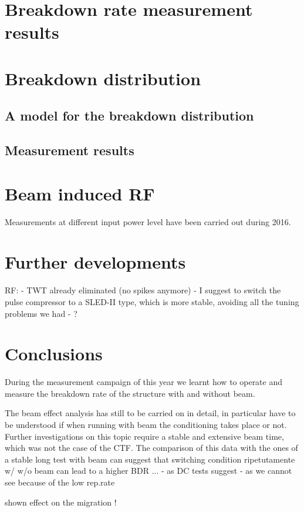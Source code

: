 \section[Breakdown rate measurement results]{Breakdown rate measurement results}



\section[Breakdown distribution]{Breakdown distribution}

\subsection[A model for the breakdown distribution]{A model for the breakdown distribution}

\subsection[Measurement results]{Measurement results}




\section[Beam induced RF]{Beam induced RF}

Measurements at different input power level have been carried out during 2016. 






\section[Further developments]{Further developments}


RF:
- TWT already eliminated (no spikes anymore)
- I suggest to switch the pulse compressor to a SLED-II type, which is more stable, avoiding all the tuning problems we had
- ?


\section{Conclusions}

During the measurement campaign of this year we learnt how to operate and measure the breakdown rate of the structure with and without beam.

The beam effect analysis has still to be carried on in detail, in particular have to be understood if when running with beam the conditioning takes place or not. Further investigations on this topic require a stable and extensive beam time, which was not the case of the CTF. The comparison of this data with the ones of a stable long test with beam can suggest that switching condition ripetutamente w/ w/o beam can lead to a higher BDR ...
- as DC tests suggest
- as we cannot see because of the low rep.rate



shown effect on the migration !